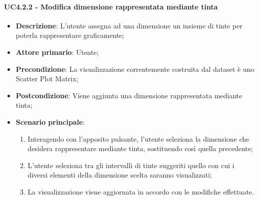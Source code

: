 \paragraph{UC4.2.2 - Modifica dimensione rappresentata mediante tinta}
\label{par:uc4.2.2}
\begin{itemize}

    \item \textbf{Descrizione}:     L'utente assegna ad una dimensione un insieme di tinte per poterla rappresentare
                                    graficamente;

    \item \textbf{Attore primario}: Utente;
    \item \textbf{Precondizione}:   La visualizzazione correntemente costruita dal dataset è uno Scatter Plot Matrix;
    \item \textbf{Postcondizione}:  Viene aggiunta una dimensione rappresentata mediante tinta;
    \item \textbf{Scenario principale}:
    \begin{enumerate}

        \item   Interagendo con l'apposito pulsante, l'utente seleziona la dimensione che desidera rappresentare
                mediante tinta, sostituendo così quella precedente;

        \item   L'utente seleziona tra gli intervalli di tinte suggeriti quello con cui i diversi elementi della
                dimensione scelta saranno visualizzati;

        \item   La visualizzazione viene aggiornata in accordo con le modifiche effettuate.
    \end{enumerate}
\end{itemize}

